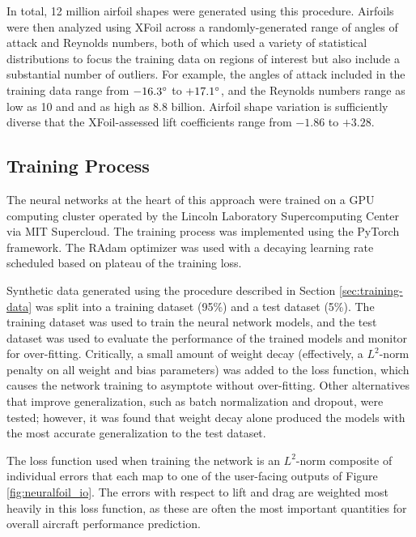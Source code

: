 \documentclass[conf]{new-aiaa}
\begin{document}
    In total, 12 million airfoil shapes were generated using this procedure. Airfoils were then analyzed using XFoil across a randomly-generated range of angles of attack and Reynolds numbers, both of which used a variety of statistical distributions to focus the training data on regions of interest but also include a substantial number of outliers. For example, the angles of attack included in the training data range from $-16.3\degree$ to $+17.1\degree$, and the Reynolds numbers range as low as 10 and and as high as 8.8 billion. Airfoil shape variation is sufficiently diverse that the XFoil-assessed lift coefficients range from $-1.86$ to $+3.28$.

    \subsection{Training Process}
    \label{sec:training-process}

    The neural networks at the heart of this approach were trained on a GPU computing cluster operated by the Lincoln Laboratory Supercomputing Center via MIT Supercloud. The training process was implemented using the PyTorch \cite{paszke_pytorch_2019} framework. The RAdam optimizer \cite{liu_variance_2019} was used with a decaying learning rate scheduled based on plateau of the training loss.

    Synthetic data generated using the procedure described in Section \ref{sec:training-data} was split into a training dataset (95\%) and a test dataset (5\%). The training dataset was used to train the neural network models, and the test dataset was used to evaluate the performance of the trained models and monitor for over-fitting. Critically, a small amount of weight decay (effectively, a $L^2$-norm penalty on all weight and bias parameters) was added to the loss function, which causes the network training to asymptote without over-fitting. Other alternatives that improve generalization, such as batch normalization and dropout, were tested; however, it was found that weight decay alone produced the models with the most accurate generalization to the test dataset.

    The loss function used when training the network is an $L^2$-norm composite of individual errors that each map to one of the user-facing outputs of Figure \ref{fig:neuralfoil_io}. The errors with respect to lift and drag are weighted most heavily in this loss function, as these are often the most important quantities for overall aircraft performance prediction.
\end{document}
